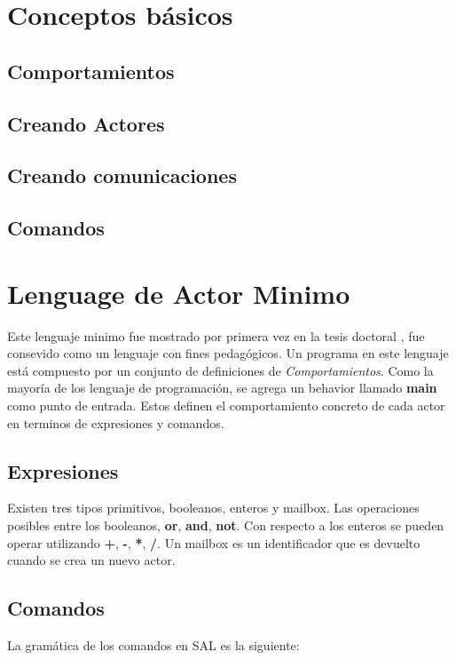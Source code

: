 \documentclass[fleqn]{article}
\begin{document}
\section{Conceptos básicos}

\subsection*{Comportamientos}

\subsection*{Creando Actores}

\subsection*{Creando comunicaciones}

\subsection*{Comandos}

\section{Lenguage de Actor Minimo}

Este lenguaje minimo fue mostrado por primera vez en la tesis doctoral
\cite{Agha:1986:AMC:7929}, fue consevido como un lenguaje  con fines pedagógicos.
Un programa en este lenguaje está compuesto por un conjunto de definiciones de
\textit{Comportamientos}. Como la mayoría de los lenguaje de programación,
se agrega un behavior llamado \textbf{main} como punto de entrada.
Estos definen el comportamiento concreto de cada actor en terminos de
expresiones y comandos.

\subsection{Expresiones}

Existen tres tipos primitivos, booleanos, enteros y mailbox. Las operaciones
posibles entre los booleanos, \textbf{or}, \textbf{and}, \textbf{not}. Con
respecto a los enteros se pueden operar utilizando \textbf{+}, \textbf{-},
\textbf{*}, \textbf{/}. Un mailbox es un identificador que es devuelto cuando se
crea un nuevo actor.

\subsection{Comandos}
La gramática de los comandos en SAL es la siguiente:
\end{document}
